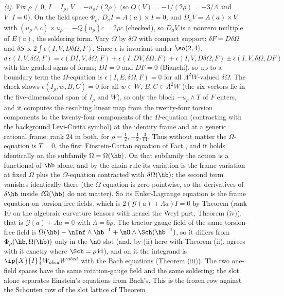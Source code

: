 \emph{(i).} Fix $\rho \neq 0$, $I = I_{\rho}$, $V = -u_{\rho}/(2\rho)$ (so $Q(V) = -1/(2\rho) = -3/\Lambda$ and $V \cdot I = 0$). On the field space $\Phi_{\rho}$, $D_{a}I = A(a) \times I = 0$, and $D_{a}V = A(a) \times V$ with $(u_{\rho} \wedge c) \times u_{\rho} = -Q(u_{\rho})c = 2\rho c$ (checked), so $D_{a}V$ is a nonzero multiple of $E(a)$, the soldering form. Vary $\Omega$ by $\delta\Omega$ with compact support: $\delta F = D\delta\Omega$ and $\delta S \propto 2\int\epsilon(I, V, D\delta\Omega, F)$. Since $\epsilon$ is invariant under $\so(2,4)$, $d\,\epsilon(I, V, \delta\Omega, F) = \epsilon(DI, V, \delta\Omega, F) + \epsilon(I, DV, \delta\Omega, F) + \epsilon(I, V, D\delta\Omega, F) \pm \epsilon(I, V, \delta\Omega, DF)$ with the graded signs of forms; $DI = 0$ and $DF = 0$ (Bianchi), so up to a boundary term the $\Omega$-equation is $\epsilon(I, E, \delta\Omega, F) = 0$ for all $\Lambda^{2}W$-valued $\delta\Omega$. The check shows $\epsilon(I_{\rho}, w, B, C) = 0$ for all $w \in W$, $B, C \in \Lambda^{2}W$ (the six vectors lie in the five-dimensional span of $I_{\rho}$ and $W$), so only the block $-u_{\rho} \wedge T$ of $F$ enters, and it computes the resulting linear map from the twenty-four torsion components to the twenty-four components of the $\Omega$-equation (contracting with the background Levi-Civita symbol) at the identity frame and at a generic rational frame: rank $24$ in both, for $\rho = \tfrac12, -\tfrac12, \tfrac{3}{14}$. Thus without matter the $\Omega$-equation is $T = 0$, the first Einstein-Cartan equation of Fact , and it holds identically on the subfamily $\Omega = \Omega(\hb)$. On that subfamily the action is a functional of $\hb$ alone, and by the chain rule its variation is the frame variation at fixed $\Omega$ plus the $\Omega$-equation contracted with $\delta\Omega(\hb)$; the second term vanishes identically there (the $\Omega$-equation is zero pointwise, so the derivatives of $\delta\hb$ inside $\delta\Omega(\hb)$ do not matter). So its Euler-Lagrange equation is the frame equation on torsion-free fields, which is $2(\mathcal{G}(a) + \Lambda a)I = 0$ by Theorem  (rank $10$ on the algebraic curvature tensors with kernel the Weyl part, Theorem (iv)), that is $\mathcal{G}(a) + \Lambda a = 0$ with $\Lambda = 6\rho$. The tractor gauge field of the same torsion-free field is $\Omega(\hb) - \nInf \wedge \hb^{-1} + \nO \wedge \Sch(\hb^{-1})$, so it differs from $\Phi_{\rho}(\hb, \Omega(\hb))$ only in the $\nO$ slot (and, by (ii) here with Theorem (ii), agrees with it exactly where $\Sch = \rho\,\mathrm{id}$), and on it the integrand is $\ip{X}{I}\tfrac14 W_{abcd}W^{abcd}$ with the Bach equations (Theorem (iii)). The two one-field spaces have the same rotation-gauge field and the same soldering; the slot alone separates Einstein's equations from Bach's. This is the frozen row against the Schouten row of the slot lattice of Theorem 